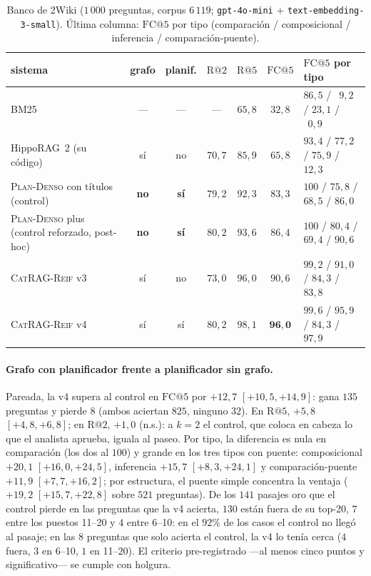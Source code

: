 \documentclass[11pt,a4paper]{article}
\newcommand{\sys}{\textsc{CatRAG-Reif}}
\newcommand{\hippo}{HippoRAG~2}
\newcommand{\ctrl}{\textsc{Plan-Denso}}
\begin{document}
\begin{table}[t]
\centering\footnotesize\setlength{\tabcolsep}{4pt}
\caption{Banco de 2Wiki ($1\,000$ preguntas, corpus $6\,119$;
\texttt{gpt-4o-mini} + \texttt{text-embedding-3-small}). Última columna:
$\mathrm{FC@}5$ por tipo (comparación / composicional / inferencia /
comparación-puente).}
\label{tab:banco2wiki}
\begin{tabular}{lcccccl}
\toprule
sistema & grafo & planif. & $\mathrm{R@}2$ & $\mathrm{R@}5$ & $\mathrm{FC@}5$ & $\mathrm{FC@}5$ por tipo\\
\midrule
BM25 & --- & --- & --- & $65{,}8$ & $32{,}8$ & $86{,}5$ / $\;\,9{,}2$ / $23{,}1$ / $\;\,0{,}9$\\
\hippo{} (su código) & sí & no & $70{,}7$ & $85{,}9$ & $65{,}8$ & $93{,}4$ / $77{,}2$ / $75{,}9$ / $12{,}3$\\
\ctrl{} con títulos (control) & \textbf{no} & \textbf{sí} & $79{,}2$ & $92{,}3$ & $83{,}3$ & $100$ / $75{,}8$ / $68{,}5$ / $86{,}0$\\
\ctrl{} plus (control reforzado, post-hoc) & \textbf{no} & \textbf{sí} & $80{,}2$ & $93{,}6$ & $86{,}4$ & $100$ / $80{,}4$ / $69{,}4$ / $90{,}6$\\
\sys{} v3 & sí & no & $73{,}0$ & $96{,}0$ & $90{,}6$ & $99{,}2$ / $91{,}0$ / $84{,}3$ / $83{,}8$\\
\sys{} v4 & sí & sí & $80{,}2$ & $98{,}1$ & $\mathbf{96{,}0}$ & $99{,}6$ / $95{,}9$ / $84{,}3$ / $97{,}9$\\
\bottomrule
\end{tabular}
\end{table}

\paragraph{Grafo con planificador frente a planificador sin grafo.}
Pareada, la v4 supera al control en $\mathrm{FC@}5$ por $+12{,}7$
$[+10{,}5,+14{,}9]$: gana $135$ preguntas y pierde $8$ (ambos aciertan
$825$, ninguno $32$). En $\mathrm{R@}5$, $+5{,}8$ $[+4{,}8,+6{,}8]$; en
$\mathrm{R@}2$, $+1{,}0$ (n.s.): a $k{=}2$ el control, que coloca en cabeza
lo que el analista aprueba, iguala al paseo. Por tipo, la diferencia es
nula en comparación (los dos al $100$) y grande en los tres tipos con
puente: composicional $+20{,}1$ $[+16{,}0,+24{,}5]$, inferencia $+15{,}7$
$[+8{,}3,+24{,}1]$ y comparación-puente $+11{,}9$ $[+7{,}7,+16{,}2]$; por
estructura, el puente simple concentra la ventaja ($+19{,}2$
$[+15{,}7,+22{,}8]$ sobre $521$ preguntas). De los $141$ pasajes oro que el
control pierde en las preguntas que la v4 acierta, $130$ están fuera de
su top-20, $7$ entre los puestos 11--20 y $4$ entre 6--10: en el $92\%$ de
los casos el control no llegó al pasaje; en las $8$ preguntas que solo
acierta el control, la v4 lo tenía cerca ($4$ fuera, $3$ en 6--10, $1$ en
11--20). El criterio pre-registrado ---al menos cinco puntos y
significativo--- se cumple con holgura.
\end{document}
